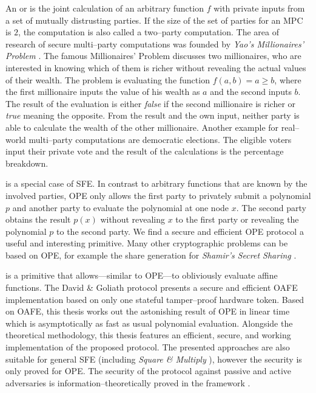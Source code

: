 \label{sec:introduction}

An  or  is the joint calculation of an arbitrary function $f$ with
private inputs from a set of mutually distrusting parties. If the size of the
set of parties for an MPC is $2$, the computation is also called a two--party
computation. The area of research of secure multi--party computations was
founded by \emph{Yao's Millionaires' Problem} \cite{yao82}. The famous
Millionaires' Problem discusses two millionaires, who are interested in knowing
which of them is richer without revealing the actual values of their wealth. The
problem is evaluating the function $f(a, b) = a \geq b$, where the first
millionaire inputs the value of his wealth as $a$ and the second inputs $b$. The
result of the evaluation is either \textit{false} if the second millionaire is
richer or \textit{true} meaning the opposite. From the result and the own input,
neither party is able to calculate the wealth of the other millionaire. Another
example for real--world multi--party computations are democratic elections. The
eligible voters input their private vote and the result of the calculations is
the percentage breakdown.

 \cite{naor99,naor06} is a special
case of SFE. In contrast to arbitrary functions that are known by the involved
parties, OPE only allows the first party to privately submit a polynomial $p$
and another party to evaluate the polynomial at one node $x$. The second party
obtains the result $p(x)$ without revealing $x$ to the first party or revealing
the polynomial $p$ to the second party. We find a secure and efficient OPE
protocol a useful and interesting primitive. Many other cryptographic problems
can be based on OPE, for example the share generation for \emph{Shamir's Secret
Sharing} \cite{shamir79}.

 \cite{davidgoliath} is a
primitive that allows---similar to OPE---to obliviously evaluate affine
functions. The David \& Goliath protocol \cite{davidgoliath} presents a secure
and efficient OAFE implementation based on only one stateful tamper--proof
hardware token. Based on OAFE, this thesis works out the astonishing result of
OPE in linear time which is asymptotically as fast as usual polynomial
evaluation. Alongside the theoretical methodology, this thesis features an
efficient, secure, and working implementation of the proposed protocol. The
presented approaches are also suitable for general SFE (including \emph{Square
\& Multiply} \cite{knuth81}), however the security is only proved for OPE. The
security of the protocol against passive and active adversaries is
in\-for\-ma\-tion--the\-o\-ret\-ically proved in the  framework \cite{canetti05}. 


